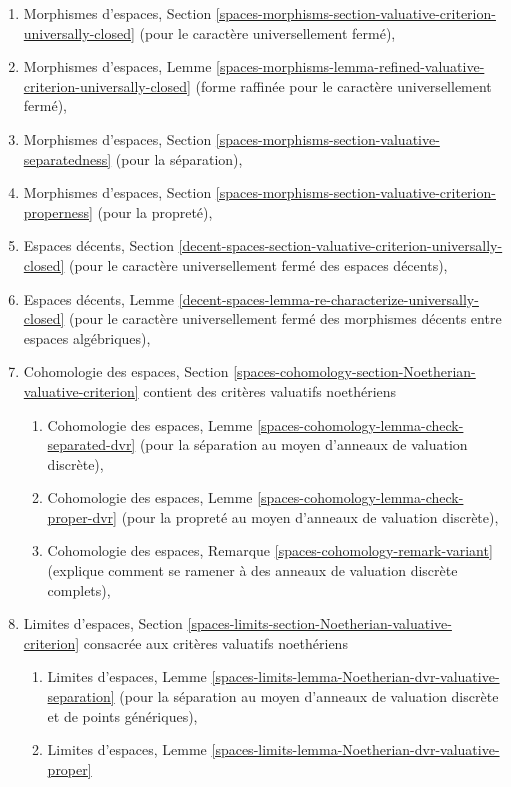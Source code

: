 \begin{enumerate}
\item Morphismes d'espaces, Section
\ref{spaces-morphisms-section-valuative-criterion-universally-closed}
(pour le caractère universellement fermé),
\item Morphismes d'espaces, Lemme
\ref{spaces-morphisms-lemma-refined-valuative-criterion-universally-closed}
(forme raffinée pour le caractère universellement fermé),
\item Morphismes d'espaces, Section
\ref{spaces-morphisms-section-valuative-separatedness}
(pour la séparation),
\item Morphismes d'espaces, Section
\ref{spaces-morphisms-section-valuative-criterion-properness}
(pour la propreté),
\item Espaces décents, Section
\ref{decent-spaces-section-valuative-criterion-universally-closed}
(pour le caractère universellement fermé des espaces décents),
\item Espaces décents, Lemme
\ref{decent-spaces-lemma-re-characterize-universally-closed}
(pour le caractère universellement fermé des morphismes décents entre espaces algébriques),
\item Cohomologie des espaces, Section
\ref{spaces-cohomology-section-Noetherian-valuative-criterion}
contient des critères valuatifs noethériens
\begin{enumerate}
\item Cohomologie des espaces, Lemme
\ref{spaces-cohomology-lemma-check-separated-dvr}
(pour la séparation au moyen d'anneaux de valuation discrète),
\item Cohomologie des espaces, Lemme
\ref{spaces-cohomology-lemma-check-proper-dvr}
(pour la propreté au moyen d'anneaux de valuation discrète),
\item Cohomologie des espaces, Remarque
\ref{spaces-cohomology-remark-variant}
(explique comment se ramener à des anneaux de valuation discrète complets),
\end{enumerate}
\item Limites d'espaces, Section
\ref{spaces-limits-section-Noetherian-valuative-criterion}
consacrée aux critères valuatifs noethériens
\begin{enumerate}
\item Limites d'espaces, Lemme
\ref{spaces-limits-lemma-Noetherian-dvr-valuative-separation}
(pour la séparation au moyen d'anneaux de valuation discrète et de points génériques),
\item Limites d'espaces, Lemme
\ref{spaces-limits-lemma-Noetherian-dvr-valuative-proper}

\end{enumerate}
\end{enumerate}
